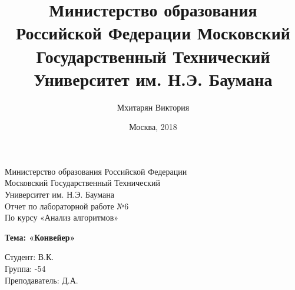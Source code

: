 \documentclass[a4paper,12pt]{article}
\title{Министерство образования Российской Федерации
Московский Государственный Технический Университет им. Н.Э. Баумана}
\author{Мхитарян Виктория}
\date{Москва, 2018}
\begin{document}
\thispagestyle{empty}

\begin{figure}[th]
\noindent{}
\end{figure}

\begin{center}
    {\Large Министерство образования Российской Федерации\\
Московский Государственный Технический\\ Университет им. Н.Э. Баумана \\[66pt]
Отчет по лабораторной работе №6 \\
По курсу «Анализ алгоритмов»}
\end{center}

\begin{center}
    {\LARGE \textbf{Тема: «Конвейер»\\[90pt]}}
\end{center}

\begin{flushright}
Студент: { В.К.}\\ Группа: {-54}\\[20pt] 
Преподаватель: { Д.А.}\\[80pt]
\end{flushright}
\end{document}
